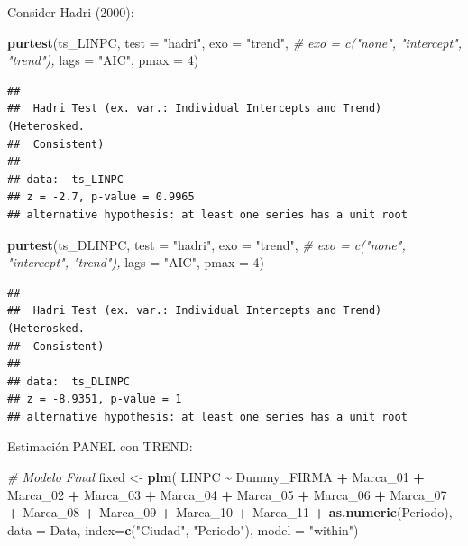 \documentclass[
]{book}
\newenvironment{Shaded}{\begin{snugshade}}{\end{snugshade}}
\newcommand{\AttributeTok}[1]{\textcolor[rgb]{0.13,0.29,0.53}{#1}}
\newcommand{\CommentTok}[1]{\textcolor[rgb]{0.56,0.35,0.01}{\textit{#1}}}
\newcommand{\DecValTok}[1]{\textcolor[rgb]{0.00,0.00,0.81}{#1}}
\newcommand{\FunctionTok}[1]{\textcolor[rgb]{0.13,0.29,0.53}{\textbf{#1}}}
\newcommand{\NormalTok}[1]{#1}
\newcommand{\OtherTok}[1]{\textcolor[rgb]{0.56,0.35,0.01}{#1}}
\newcommand{\SpecialCharTok}[1]{\textcolor[rgb]{0.81,0.36,0.00}{\textbf{#1}}}
\newcommand{\StringTok}[1]{\textcolor[rgb]{0.31,0.60,0.02}{#1}}
\begin{document}
Consider Hadri (2000):

\begin{Shaded}
\begin{Highlighting}[]
\FunctionTok{purtest}\NormalTok{(ts\_LINPC, }\AttributeTok{test =} \StringTok{"hadri"}\NormalTok{, }\AttributeTok{exo =} \StringTok{"trend"}\NormalTok{, }\CommentTok{\# exo = c("none", "intercept", "trend"),}
        \AttributeTok{lags =} \StringTok{"AIC"}\NormalTok{, }\AttributeTok{pmax =} \DecValTok{4}\NormalTok{)}
\end{Highlighting}
\end{Shaded}

\begin{verbatim}
## 
##  Hadri Test (ex. var.: Individual Intercepts and Trend) (Heterosked.
##  Consistent)
## 
## data:  ts_LINPC
## z = -2.7, p-value = 0.9965
## alternative hypothesis: at least one series has a unit root
\end{verbatim}

\begin{Shaded}
\begin{Highlighting}[]
\FunctionTok{purtest}\NormalTok{(ts\_DLINPC, }\AttributeTok{test =} \StringTok{"hadri"}\NormalTok{, }\AttributeTok{exo =} \StringTok{"trend"}\NormalTok{, }\CommentTok{\# exo = c("none", "intercept", "trend"),}
        \AttributeTok{lags =} \StringTok{"AIC"}\NormalTok{, }\AttributeTok{pmax =} \DecValTok{4}\NormalTok{)}
\end{Highlighting}
\end{Shaded}

\begin{verbatim}
## 
##  Hadri Test (ex. var.: Individual Intercepts and Trend) (Heterosked.
##  Consistent)
## 
## data:  ts_DLINPC
## z = -8.9351, p-value = 1
## alternative hypothesis: at least one series has a unit root
\end{verbatim}

Estimación PANEL con TREND:

\begin{Shaded}
\begin{Highlighting}[]
\CommentTok{\# Modelo Final}
\NormalTok{fixed }\OtherTok{\textless{}{-}} \FunctionTok{plm}\NormalTok{( LINPC }\SpecialCharTok{\textasciitilde{}}\NormalTok{ Dummy\_FIRMA }\SpecialCharTok{+}\NormalTok{ Marca\_01 }\SpecialCharTok{+}\NormalTok{ Marca\_02 }\SpecialCharTok{+}\NormalTok{ Marca\_03 }\SpecialCharTok{+}\NormalTok{ Marca\_04 }\SpecialCharTok{+}\NormalTok{ Marca\_05 }\SpecialCharTok{+} 
\NormalTok{              Marca\_06 }\SpecialCharTok{+}\NormalTok{ Marca\_07 }\SpecialCharTok{+}\NormalTok{ Marca\_08 }\SpecialCharTok{+}\NormalTok{ Marca\_09 }\SpecialCharTok{+}\NormalTok{ Marca\_10 }\SpecialCharTok{+}\NormalTok{ Marca\_11 }\SpecialCharTok{+} \FunctionTok{as.numeric}\NormalTok{(Periodo),}
             \AttributeTok{data =}\NormalTok{ Data, }
             \AttributeTok{index=}\FunctionTok{c}\NormalTok{(}\StringTok{"Ciudad"}\NormalTok{, }\StringTok{"Periodo"}\NormalTok{), }
             \AttributeTok{model =} \StringTok{"within"}\NormalTok{)}
\end{Highlighting}
\end{Shaded}
\end{document}
